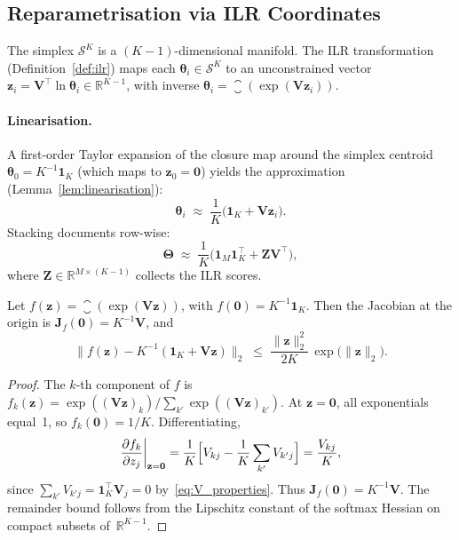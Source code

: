 \subsection{Reparametrisation via ILR Coordinates}
\label{subsec:reparametrisation}

The simplex $\mathcal{S}^K$ is a $(K{-}1)$-dimensional manifold. The
ILR transformation (Definition~\ref{def:ilr}) maps each
$\boldsymbol{\theta}_i\in\mathcal{S}^K$ to an unconstrained vector
$\mathbf{z}_i = \mathbf{V}^{\!\top}\ln\boldsymbol{\theta}_i
 \in\mathbb{R}^{K-1}$,
with inverse
$\boldsymbol{\theta}_i
 = \closure(\exp(\mathbf{V}\mathbf{z}_i))$.

\paragraph{Linearisation.}
A first-order Taylor expansion of the closure map around the simplex
centroid $\boldsymbol{\theta}_0 = K^{-1}\mathbf{1}_K$ (which maps to
$\mathbf{z}_0=\mathbf{0}$) yields the approximation
(Lemma~\ref{lem:linearisation}):
%
\begin{equation}
  \boldsymbol{\theta}_i
  \;\approx\;
  \frac{1}{K}\bigl(\mathbf{1}_K + \mathbf{V}\mathbf{z}_i\bigr).
  \label{eq:theta_approx}
\end{equation}
%
Stacking documents row-wise:
\begin{equation}
  \boldsymbol{\Theta}
  \;\approx\;
  \frac{1}{K}
  \bigl(\mathbf{1}_M\mathbf{1}_K^{\!\top}
        + \mathbf{Z}\mathbf{V}^{\!\top}\bigr),
  \label{eq:Theta_approx}
\end{equation}
where $\mathbf{Z}\in\mathbb{R}^{M\times(K{-}1)}$ collects the ILR
scores.

\begin{lemma}
\label{lem:linearisation}
Let $f(\mathbf{z}) = \closure(\exp(\mathbf{V}\mathbf{z}))$, with
$f(\mathbf{0})=K^{-1}\mathbf{1}_K$. Then the Jacobian at the origin is
$\mathbf{J}_f(\mathbf{0}) = K^{-1}\mathbf{V}$, and
\[
  \bigl\|
    f(\mathbf{z})
    - K^{-1}(\mathbf{1}_K + \mathbf{V}\mathbf{z})
  \bigr\|_2
  \;\leq\;
  \frac{\|\mathbf{z}\|_2^2}{2K}
  \,\exp\!\bigl(\|\mathbf{z}\|_2\bigr).
\]
\end{lemma}

\begin{proof}
The $k$-th component of $f$ is
$f_k(\mathbf{z}) = \exp((\mathbf{V}\mathbf{z})_k)/\sum_{k'}
\exp((\mathbf{V}\mathbf{z})_{k'})$.
At $\mathbf{z}=\mathbf{0}$, all exponentials equal~1, so
$f_k(\mathbf{0})=1/K$. Differentiating,
\[
  \frac{\partial f_k}{\partial z_j}\bigg|_{\mathbf{z}=\mathbf{0}}
  = \frac{1}{K}\Bigl[V_{kj}
    - \frac{1}{K}\sum_{k'}V_{k'j}\Bigr]
  = \frac{V_{kj}}{K},
\]
since $\sum_{k'}V_{k'j} = \mathbf{1}_K^{\!\top}\mathbf{V}_j = 0$
by~\eqref{eq:V_properties}. Thus
$\mathbf{J}_f(\mathbf{0}) = K^{-1}\mathbf{V}$.
The remainder bound follows from the Lipschitz constant of the
softmax Hessian on compact subsets of~$\mathbb{R}^{K-1}$.
\end{proof}

